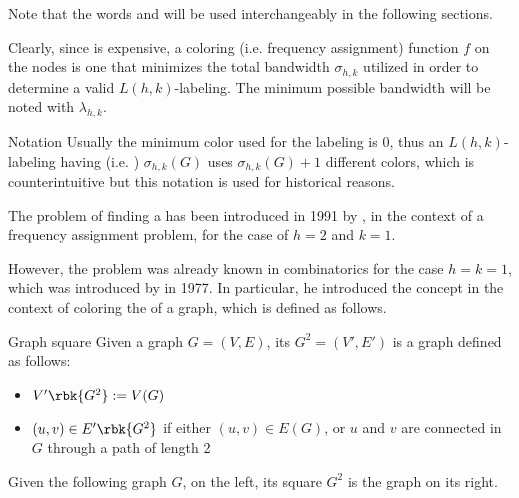 \documentclass[a4paper, 12pt]{report}
\begin{document}
    Note that the words  and  will be used interchangeably in the following sections.
    
    Clearly, since  is expensive, a  coloring (i.e. frequency assignment) function $f$ on the nodes is one that minimizes the total bandwidth $\sigma_{h, k}$ utilized in order to determine a valid $L(h, k)$-labeling. The minimum possible bandwidth will be noted with $\lambda_{h, k}$.
    
    \begin{framedobs}{Notation}
        Usually the minimum color used for the labeling is 0, thus an $L(h, k)$-labeling having  (i.e. ) $\sigma_{h, k}(G)$ uses $\sigma_{h, k}(G) + 1$ different colors, which is counterintuitive but this notation is used for historical reasons.
    \end{framedobs}

    The problem of finding a  has been introduced in 1991 by \textcite{griggs}, in the context of a frequency assignment problem, for the case of $h = 2$ and $k = 1$.

    However, the problem was already known in combinatorics for the case $h = k = 1$, which was introduced by \textcite{wegner} in 1977. In particular, he introduced the concept in the context of coloring the  of a graph, which is defined as follows.

    \begin{frameddefn}{Graph square}
        Given a graph $G = (V, E)$, its  $G^2 = (V', E')$ is a graph defined as follows:
        
        \begin{itemize}
            \item $V'\rbk{G^2} := V(G)$
            \item $(u, v) \in E'\rbk{G^2}$ if either $(u, v) \in E(G)$, or $u$ and $v$ are connected in $G$ through a path of length 2
        \end{itemize}
    \end{frameddefn}

    \begin{example}
        Given the following graph $G$, on the left, its square $G^2$ is the graph on its right.

    \end{example}
\end{document}
